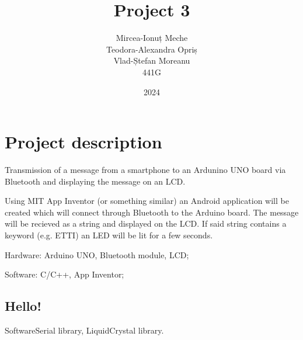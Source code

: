 

\title{
    Project 3
}

\author{
    Mircea-Ionuț Meche\\
    Teodora-Alexandra Opriș\\
    Vlad-Ștefan Moreanu\\
    441G
}


\date{2024}





\maketitle

\tableofcontents

\listoffigures

\chapter{Project description}

Transmission of a message from a smartphone to an Ardunino UNO board via
Bluetooth and displaying the message on an LCD.

Using MIT App Inventor (or something similar) an Android application will be
created which will connect through Bluetooth to the Arduino board. The message
will be recieved as a string and displayed on the LCD. If said string contains
a keyword (e.g. ETTI) an LED will be lit for a few seconds.

Hardware: Arduino UNO, Bluetooth module, LCD;

Software: C/C++, App Inventor;

\section{Hello!}

SoftwareSerial library\cite{softserial}, LiquidCrystal library\cite{lcd}.

\lipsum[1]

\lipsum[2]

\printbibliography



